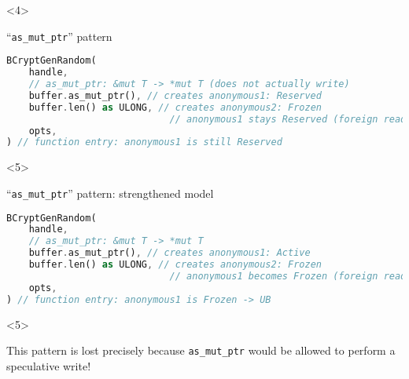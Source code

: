 \begin{frame}[fragile, t]
    \begin{onlyenv}<4>
        \begin{block}{{\cmark} ``\texttt{as\_mut\_ptr}'' pattern}
            \begin{lstlisting}[language=rust, basicstyle=\ttfamily\scriptsize]
BCryptGenRandom(
    handle,
    // as_mut_ptr: &mut T -> *mut T (does not actually write)
    buffer.as_mut_ptr(), // creates anonymous1: Reserved
    buffer.len() as ULONG, // creates anonymous2: Frozen
                             // anonymous1 stays Reserved (foreign read)
    opts,
) // function entry: anonymous1 is still Reserved
            \end{lstlisting}
        \end{block}
    \end{onlyenv}

    \begin{onlyenv}<5>
        \begin{block}{{\xmark} ``\texttt{as\_mut\_ptr}'' pattern: strengthened model}
            \begin{lstlisting}[language=rust, basicstyle=\ttfamily\scriptsize]
BCryptGenRandom(
    handle,
    // as_mut_ptr: &mut T -> *mut T
    buffer.as_mut_ptr(), // creates anonymous1: Active
    buffer.len() as ULONG, // creates anonymous2: Frozen
                             // anonymous1 becomes Frozen (foreign read)
    opts,
) // function entry: anonymous1 is Frozen -> UB
            \end{lstlisting}
        \end{block}
    \end{onlyenv}
    \begin{onlyenv}<5>
        \begin{block}{}
            This pattern is lost precisely because \texttt{as\_mut\_ptr}
            would be allowed to perform a speculative write!
        \end{block}
    \end{onlyenv}
\end{frame}

